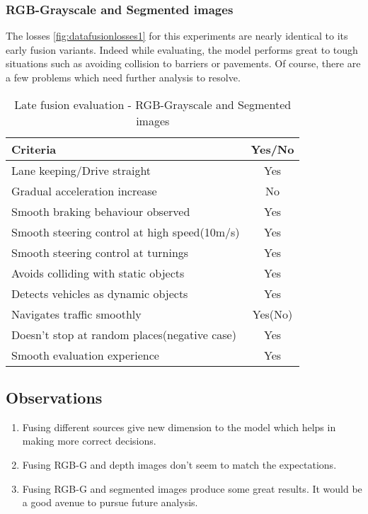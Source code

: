 \subsubsection*{RGB-Grayscale and Segmented images}
The losses \ref{fig:datafusionlosses1} for this experiments are nearly identical to its early fusion variants.
Indeed while evaluating, the model performs great to tough situations such as avoiding
collision to barriers or pavements. Of course, there are a few problems which need further
analysis to resolve.
\begin{table}[!ht]
    \centering
\begin{tabular}{lc}
    \toprule
    Criteria  & Yes/No \\\midrule
    Lane keeping/Drive straight  & Yes  \\
    Gradual acceleration increase  & No\\
    Smooth braking behaviour observed & Yes \\
    Smooth steering control at high speed(10m/s) & Yes \\
    Smooth steering control at turnings & Yes\\
    Avoids colliding with static objects & Yes \\
    Detects vehicles as dynamic objects & Yes \\
    Navigates traffic smoothly & Yes(No)\\
    Doesn't stop at random places(negative case) & Yes \\
    Smooth evaluation experience & Yes \\\bottomrule
\end{tabular}
\caption{Late fusion evaluation - RGB-Grayscale and Segmented images}
\label{table:latefusionrgbseg}
\end{table}
\subsection*{Observations}
\begin{enumerate}
    \item Fusing different sources give new dimension to the model which helps in making
        more correct decisions.
    \item Fusing RGB-G and depth images don't seem to match the expectations.
    \item Fusing RGB-G and segmented images produce some great results. It would be a
        good avenue to pursue future analysis.
\end{enumerate}
\iffalse
